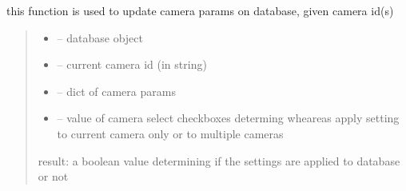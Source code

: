 \documentclass[letterpaper,10pt,english]{sphinxmanual}
\begin{document}
\begin{savenotes}\begin{fulllineitems}
\label{\detokenize{setting/backend/camera_funcs:oxin.backend.camera_funcs.set_camera_params_to_db}}
\pysigstartsignatures
{}
\pysigstopsignatures
\sphinxAtStartPar
this function is used to update camera params on database, given camera id(s)
\begin{quote}\begin{description}
\begin{itemize}
\item {} 
\sphinxAtStartPar
{} – database object

\item {} 
\sphinxAtStartPar
{} – current camera id (in string)

\item {} 
\sphinxAtStartPar
{} – dict of camera params

\item {} 
\sphinxAtStartPar
{} – value of camera select checkboxes determing wheareas apply setting to current camera only or to multiple cameras

\end{itemize}

\sphinxAtStartPar
result: a boolean value determining if the settings are applied to database or not

\end{description}\end{quote}

\end{fulllineitems}\end{savenotes}

\end{document}
